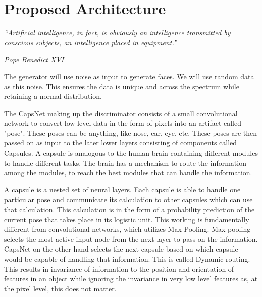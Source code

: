 \chapter{Proposed Architecture}\label{ch:proposed_architecture}
\epigraph{\textit{\normalsize “Artificial intelligence, in fact, is obviously an intelligence transmitted by conscious subjects, an intelligence placed in equipment.”}}{\textit{ \normalsize Pope Benedict XVI}}

The generator will use noise as input to generate faces. We will use random data as this noise. This ensures the data is unique and across the spectrum while retaining a normal distribution.
\par\bigskip

The CapsNet making up the discriminator consists of a small convolutional network to convert low level data in the form of pixels into an artifact called "pose". These poses can be anything, like nose, ear, eye, etc. These poses are then passed on as input to the later lower layers consisting of components called Capsules. A capsule is analogous to the human brain containing different modules to handle different tasks. The brain has a mechanism to route the information among the modules, to reach the best modules that can handle the information.
\par\bigskip

A capsule is a nested set of neural layers. Each capsule is able to handle one particular pose and communicate its calculation to other capsules which can use that calculation. This calculation is in the form of a probability prediction of the current pose that takes place in its logistic unit. This working is fundamentally different from convolutional networks, which utilizes Max Pooling. Max pooling selects the most active input node from the next layer to pass on the information. CapsNet on the other hand selects the next capsule based on which capsule would be capable of handling that information. This is called Dynamic routing. This results in invariance of information to the position and orientation of features in an object while ignoring the invariance in very low level features as, at the pixel level, this does not matter.
\par\bigskip

